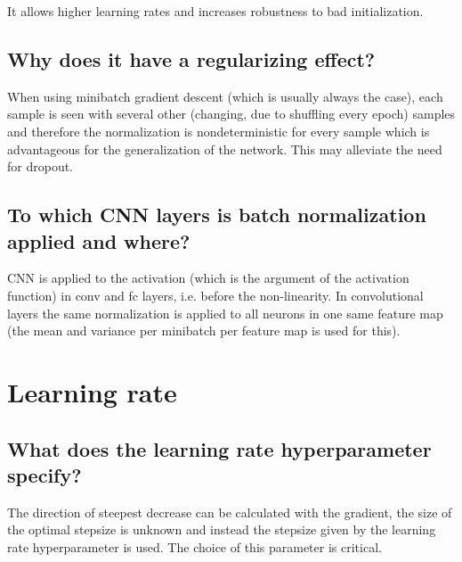 It allows higher learning rates and increases robustness to bad initialization.
\subsection{Why does it have a regularizing effect?}
When using minibatch gradient descent (which is usually always the case), each sample is seen with several other (changing, due to shuffling every epoch) samples and therefore the normalization is nondeterministic for every sample which is advantageous for the generalization of the network. This may alleviate the need for dropout.
\subsection{To which CNN layers is batch normalization applied and where?}
CNN is applied to the activation (which is the argument of the activation function) in conv and fc layers, i.e. before the non-linearity. In convolutional layers the same normalization is applied to all neurons in one same feature map (the mean and variance per minibatch per feature map is used for this).
%
\section{Learning rate}
\subsection{What does the learning rate hyperparameter specify?}
The direction of steepest decrease can be calculated with the gradient, the size of the optimal stepsize is unknown and instead the stepsize given by the learning rate hyperparameter is used. The choice of this parameter is critical. 

